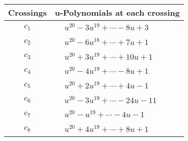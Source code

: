 \documentclass[1p]{elsarticle_modified}
\theoremstyle{definition}
\begin{document}
\begin{tabular}{m{50pt}|m{274pt}}
Crossings & \hspace{64pt}u-Polynomials at each crossing \\
\hline $$\begin{aligned}c_{1}\end{aligned}$$&$\begin{aligned}
&u^{20}-3 u^{19}+\cdots-8 u+3
\end{aligned}$\\
\hline $$\begin{aligned}c_{2}\end{aligned}$$&$\begin{aligned}
&u^{20}-6 u^{18}+\cdots+7 u+1
\end{aligned}$\\
\hline $$\begin{aligned}c_{3}\end{aligned}$$&$\begin{aligned}
&u^{20}+3 u^{19}+\cdots+10 u+1
\end{aligned}$\\
\hline $$\begin{aligned}c_{4}\end{aligned}$$&$\begin{aligned}
&u^{20}-4 u^{19}+\cdots-8 u+1
\end{aligned}$\\
\hline $$\begin{aligned}c_{5}\end{aligned}$$&$\begin{aligned}
&u^{20}+2 u^{19}+\cdots+4 u-1
\end{aligned}$\\
\hline $$\begin{aligned}c_{6}\end{aligned}$$&$\begin{aligned}
&u^{20}-3 u^{19}+\cdots-24 u-11
\end{aligned}$\\
\hline $$\begin{aligned}c_{7}\end{aligned}$$&$\begin{aligned}
&u^{20}- u^{19}+\cdots-4 u-1
\end{aligned}$\\
\hline $$\begin{aligned}c_{8}\end{aligned}$$&$\begin{aligned}
&u^{20}+4 u^{19}+\cdots+8 u+1
\end{aligned}$\\

\end{tabular}
\end{document}
